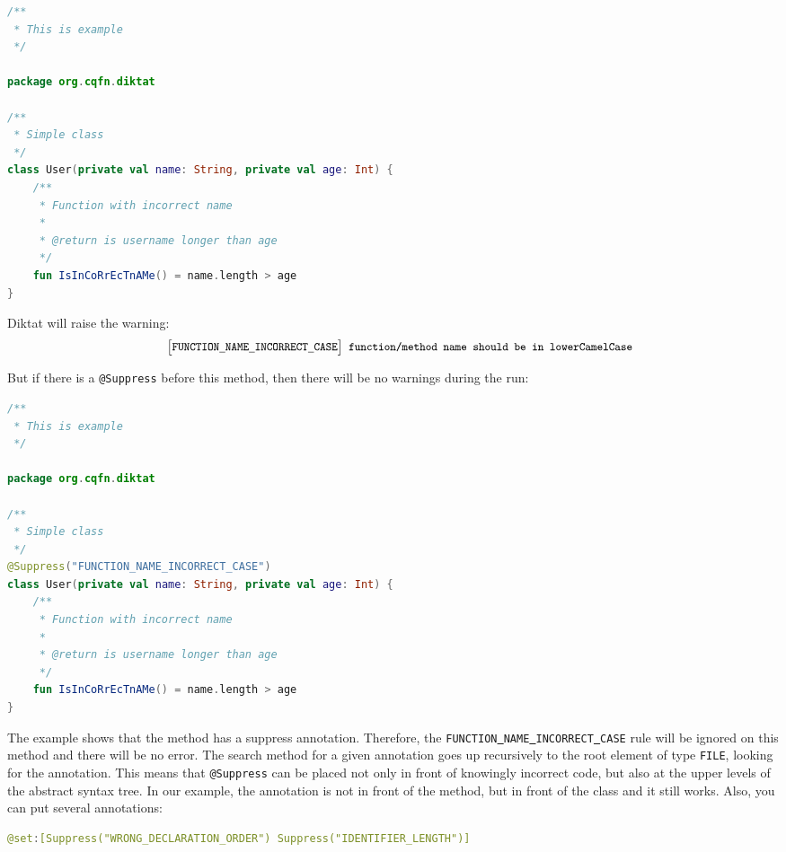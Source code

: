 \begin{lstlisting}[caption={Function with incorrect name.}, label={lst:example1}, language=Kotlin]
/**
 * This is example
 */

package org.cqfn.diktat

/**
 * Simple class
 */
class User(private val name: String, private val age: Int) {
	/**
	 * Function with incorrect name
	 *
	 * @return is username longer than age
	 */
	fun IsInCoRrEcTnAMe() = name.length > age
}

\end{lstlisting}

Diktat will raise the warning: 
$$
\texttt{ \small{ $\big[$FUNCTION\underline{ }NAME\underline{ }INCORRECT\underline{ }CASE$\big]$  function/method name should be in lowerCamelCase}}
$$

But if there is a \texttt{@Suppress} before this method, then there will be no warnings during the run:
\begin{lstlisting}[caption={Function with incorrect name, but with suppressed Inspection.}, label={lst:example1}, language=Kotlin]
/**
 * This is example
 */

package org.cqfn.diktat

/**
 * Simple class
 */
@Suppress("FUNCTION_NAME_INCORRECT_CASE")
class User(private val name: String, private val age: Int) {
	/**
	 * Function with incorrect name
	 *
	 * @return is username longer than age
	 */
	fun IsInCoRrEcTnAMe() = name.length > age
}

\end{lstlisting}

The example shows that the method has a suppress annotation. Therefore, the \texttt{FUNCTION\underline{ }NAME\underline{ }INCORRECT\underline{ }CASE} rule will be ignored on this method and there will be no error. The search method for a given annotation goes up recursively to the root element of type \texttt{FILE}, looking for the annotation. This means that \texttt{@Suppress} can be placed not only in front of knowingly incorrect code, but also at the upper levels of the abstract syntax tree. In our example, the annotation is not in front of the method, but in front of the class and it still works. Also, you can put several annotations:
\begin{lstlisting}[caption={Several suppression annotations}, label={lst:example1}, language=Kotlin]
@set:[Suppress("WRONG_DECLARATION_ORDER") Suppress("IDENTIFIER_LENGTH")]
\end{lstlisting}

